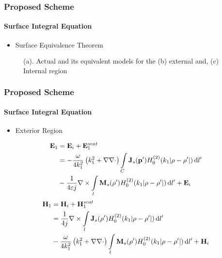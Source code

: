 \documentclass[mathserif,18pt,xcolor=table]{beamer}
\begin{document}
\begin{frame}
  \frametitle{Proposed Scheme}
  \framesubtitle{Surface Integral Equation}

  \begin{itemize}
    \item{Surface Equivalence Theorem}
  \end{itemize}
  \begin{figure}
    \centering
    \def\svgwidth{1\linewidth}
    
    \caption{(a). Actual and its equivalent models for the (b) external and, (c) Internal region }
  \end{figure}
\end{frame}
\begin{frame}
\frametitle{Proposed Scheme}
\framesubtitle{Surface Integral Equation}
\vspace*{-.4cm}
\begin{itemize}
  \item{Exterior Region}
\end{itemize}
\begin{equation} \nonumber
  \begin{split}
    \mathbf{E}_1 &= \mathbf{E}_i + \mathbf{E}_1^{scat} \\
    &=  -\frac{\omega}{4 k_1^2} \left( k_1^2 + \nabla \nabla \cdot \right) \int\limits_{C} \mathbf{J}_s(\mathbf{p}') H_0^{(2)}(k_1 |\mathbf{\rho} - \mathbf{\rho}'|) \mathop{}\!\mathrm{d}{l'} \\
    &- \frac{1}{4 \varepsilon j} \nabla \times \int\limits_{l} \mathbf{M}_s(\mathbf{\rho}') H_0^{(2)}(k_1 |\mathbf{\rho} - \mathbf{\rho}'|) \mathop{}\!\mathrm{d}{l'} + \mathbf{E}_i
  \end{split}
  \label{eq:E1sc}
\end{equation}
\begin{equation} \nonumber
  \begin{split}
    \mathbf{H}_1 &= \mathbf{H}_i + \mathbf{H}_1^{scat} \\
    &= \frac{1}{4 j} \nabla \times \int\limits_{l} \mathbf{J}_s(\mathbf{\rho}') H_0^{(2)}(k_1 |\mathbf{\rho} - \mathbf{\rho}'|) \mathop{}\!\mathrm{d}{l'} \\
    &-\frac{\omega}{4 k_1^2} \left( k_1^2 + \nabla \nabla \cdot \right) \int\limits_{l} \mathbf{M}_s(\mathbf{\rho}') H_0^{(2)}(k_1 |\mathbf{\rho} - \mathbf{\rho}'|) \mathop{}\!\mathrm{d}{l'} + \mathbf{H}_i
  \end{split}
  \label{eq:H1sc}
\end{equation}
\end{frame}
\end{document}
